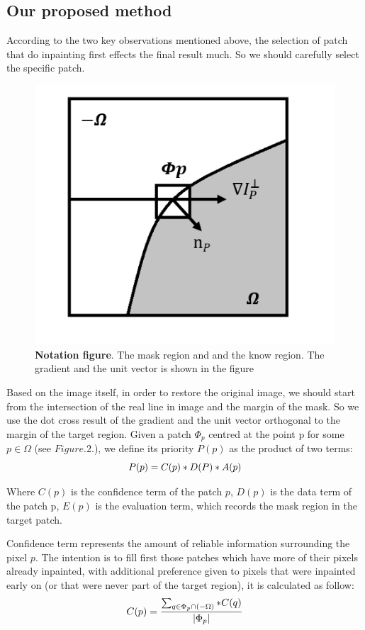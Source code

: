 \subsection{Our proposed method}
According to the two key observations mentioned above, the selection of patch that do inpainting first effects the final result much. So we should carefully select the specific patch. 
\begin{figure}
	\centering
	\includegraphics[width=0.94\linewidth]{region.jpg}
	\caption{\textbf{Notation figure}. The mask region and and the know region. The gradient and the unit vector is shown in the figure}
\end{figure}

Based on the image itself, in order to restore the original image, we should start from the intersection of the real line in image and the margin of the mask. So we use the dot cross result of the gradient and the unit vector orthogonal to the margin of the target region. Given a patch $\Phi_p$ centred at the point p for some $p \in \Omega$ (see $Figure.2$.), we define its priority $P(p)$ as the product of two terms:
\begin{equation*}
\centering
P(p)=C(p)*D(P)*A(p)
\nonumber
\end{equation*}

Where $C(p)$ is the confidence term of the patch $p$, $D(p)$ is the data term of the patch p, $E(p)$ is the evaluation term, which records the mask region in the target patch. 

Confidence term represents the amount of reliable information surrounding the pixel $p$. The
intention is to fill first those patches which have more of their pixels already inpainted, with additional preference given to pixels that were inpainted early on (or that were never part of the target region), it is calculated as follow:
\begin{equation*}
\centering
C(p)=\frac{\sum_{q\in \Phi _p\cap(-\Omega)}*C(q)}{|\Phi_p|}
\nonumber
\end{equation*}

